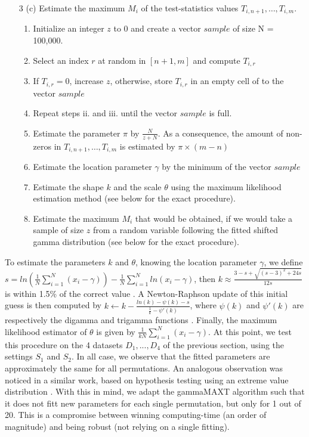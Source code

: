 \documentclass{bmcart}
\begin{document}
\begin{enumerate}
\item[3 (c)] Estimate the maximum $M_i$ of the test-statistics values $T_{i,n+1}, \ldots, T_{i,m}$.
\begin{enumerate}[label=\roman*]
\item Initialize an integer $z$ to 0 and create a vector $sample$ of size N = 100,000.
\item Select an index $r$ at random in $[n+1,m]$ and compute $T_{i,r}$
\item If $T_{i,r} = 0$, increase $z$, otherwise, store $T_{i,r}$ in an empty cell of to the vector $sample$
\item Repeat steps ii. and iii. until the vector $sample$ is full.
\item Estimate the parameter $\pi$ by $\frac{N}{z + N}$. As a consequence, the amount of non-zeros in $T_{i,n+1}, \ldots, T_{i,m}$ is estimated by $\pi \times (m-n)$
\item Estimate the location parameter $\gamma$ by the minimum of the vector $sample$
\item Estimate the shape $k$ and the scale $\theta$ using the maximum likelihood estimation method (see below for the exact procedure).
\item Estimate the maximum $M_i$ that would be obtained, if we would take a sample of size $z$ from a random variable following the fitted shifted gamma distribution (see below for the exact procedure).
\end{enumerate}
\end{enumerate}

To estimate the parameters $k$ and $\theta$, knowing the location parameter $\gamma$, we define $s = ln (\frac{1}{N} \sum\limits_{i=1}^{N} (x_i-\gamma)) - \frac{1}{N} \sum\limits_{i=1}^{N} ln(x_i-\gamma)$, then $k \approx \frac{3-s+\sqrt{(s-3)^2 + 24s}}{12s}$ is within 1.5\% of the correct value \cite{Minka2002}. A Newton-Raphson update of this initial guess is then computed by $k \leftarrow k - \frac{ln(k) - \psi(k) - s}{\frac{1}{k} - \psi'(k)}$, where $\psi(k)$ and $\psi'(k)$ are respectively the digamma and trigamma functions \cite{Choi1969}. Finally, the maximum likelihood estimator of $\theta$ is given by $\frac{1}{kN}\sum\limits_{i=1}^{N} (x_i-\gamma)$. At this point, we test this procedure on the 4 datasets $D_1, ..., D_4$ of the previous section, using the settings $S_1$ and $S_2$. In all case, we observe that the fitted parameters are approximately the same for all permutations. An analogous observation was noticed in a similar work, based on hypothesis testing using an extreme value distribution \cite{Pattin2009}. With this in mind, we adapt the gammaMAXT algorithm such that it does not fitt new parameters for each single permutation, but only for 1 out of 20. This is a compromise between winning computing-time (an order of magnitude) and being robust (not relying on a single fitting).
\end{document}
